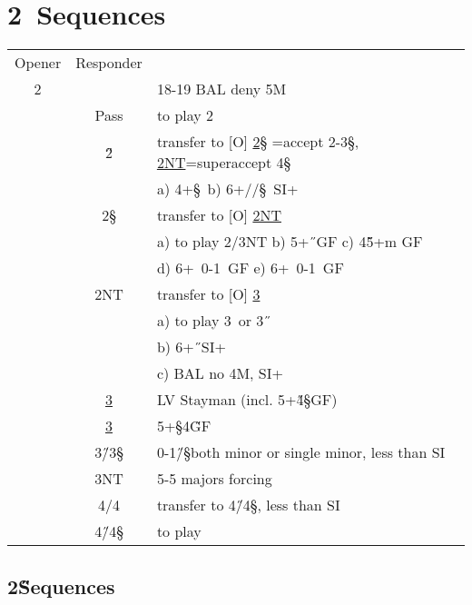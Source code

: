 \newpage

\chapter{2\D\ Sequences}

\hypertarget{2d}{}
\begin{longtable}{C{\bidlength} C{\bidlength} | l}
Opener & Responder \\
2\D  & & 18-19 BAL deny 5M\\
\hline\hline
&Pass& to play 2\D\ \\
&2\H & transfer to [O] \hyperlink{2d2h2s}{2\S} =accept 2-3\S,
                       \hyperlink{2d2h2n}{2NT}=superaccept 4\S\\
&    & a) 4+\S\ b) 6+\C/\D/\S\ SI+ \\
&2\S & transfer to [O] \hyperlink{2d2s2n}{2NT} \\
&    & a) to play 2/3NT b) 5+\H\ GF c) 4\H5+m GF \\
&    & d) 6+\C\ 0-1\D\ GF e) 6+\D\ 0-1\C\ GF \\
&2NT & transfer to [O] \hyperlink{2d2n3c}{3\C} \\
&    & a) to play 3\C\ or 3\H\ \\
&    & b) 6+\H\ SI+ \\
&    & c) BAL no 4M, SI+ \\
&\hyperlink{2d3c}{3\C} & LV Stayman (incl. 5+\H 4\S GF) \\
&\hyperlink{2d3d}{3\D} & 5+\S 4\H GF \\
&3\H/3\S & 0-1\H/\S both minor or single minor, less than SI \\
&3NT & 5-5 majors forcing \\
&4\C/4\D & transfer to 4\H/4\S, less than SI \\
&4\H/4\S & to play \\
\end{longtable}

\section{2\H Sequences}


